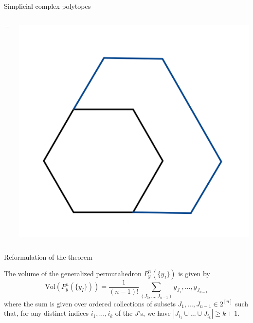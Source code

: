 \documentclass{beamer}
\begin{document}
\begin{frame}{Simplicial complex polytopes}
\begin{columns}
\begin{column}{0.1\textwidth}
   $$\longrightarrow$$
\end{column}
\begin{column}{0.3\textwidth}  %
    \begin{center}
     \includegraphics[scale=0.08]{images/P_C_3.png}
     \end{center}
\end{column}
\end{columns}    

\end{frame}



\begin{frame}{Reformulation of the theorem}
    \begin{corollary}
The volume of the generalized permutahedron $P_y^n(\{y_I\})$ is given by 
$$\text{Vol}\left( P_y^n(\{y_I\}) \right) = \frac{1}{(n-1)!} \sum_{(J_1, \dots, J_{n-1})} y_{J_1}, \dots, y_{J_{n-1}}$$
where the sum is given over ordered collections of subsets $J_1, \dots, J_{n-1} \in 2^{[n]}$ such that, for any distinct indices $i_1, \dots, i_k$ of the $J$'s, we have $|J_{i_1}\cup \ldots \cup J_{i_k}| \geq k+1$.
\end{corollary}
\end{frame}
\end{document}

